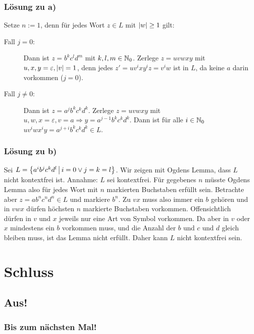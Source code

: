 \begin{frame}
\frametitle{Lösung zu a)}

Setze $n := 1$, denn für jedes Wort $z \in L$ mit $\left\vert w \right\vert \geq 1$ gilt:

\begin{description}
	\item[Fall $j = 0$:] Dann ist $z = b^kc^ld^m$ mit $k, l, m \in \mathbb{N}_0$. Zerlege $z = uvwxy$ mit $u, x, y = \varepsilon, \left\vert v \right\vert = 1$, denn jedes $z'=uv^ixy^iz = v^iw$ ist in $L$, da keine $a$ darin vorkommen ($j=0$).
	\item[Fall $j \neq 0$:] Dann ist $z=a^jb^kc^kd^k$. Zerlege $z = uvwxy$ mit $u,w, x = \varepsilon, v = a \Rightarrow y = a^{j-1}b^kc^kd^k$. Dann ist für alle $i \in \mathbb{N}_0$ $uv^iwx^iy = a^{j+i}b^kc^kd^k \in L$.
\end{description}

\end{frame}

\begin{frame}
\frametitle{Lösung zu b)}
Sei $L = \left\lbrace a^ib^jc^kd^l \,\middle\vert\, i = 0 \vee j = k = l \right\rbrace$. Wir zeigen mit Ogdens Lemma, dass $L$ nicht kontextfrei ist. \micropause
Annahme: $L$ sei kontextfrei. Für gegebenes $n$ müsste Ogdens Lemma also für jedes Wort mit $n$ markierten Buchstaben erfüllt sein. \micropause
Betrachte aber $z = ab^nc^nd^n \in L$ und markiere $b^n$. \micropause
Zu $vx$ muss also immer ein $b$ gehören und in $vwx$ dürfen höchsten $n$ markierte Buchstaben vorkommen. Offensichtlich dürfen in $v$ und $x$ jeweils nur eine Art von Symbol vorkommen. Da aber in $v$ oder $x$ mindestens ein $b$ vorkommen muss, und die Anzahl der $b$ und $c$ und $d$ gleich bleiben muss, ist das Lemma nicht erfüllt. Daher kann $L$ nicht kontextfrei sein.
\end{frame}

\section{Schluss}
\subsection{Aus!}
\begin{frame}
\frametitle{Bis zum nächsten Mal!}
\end{frame}


